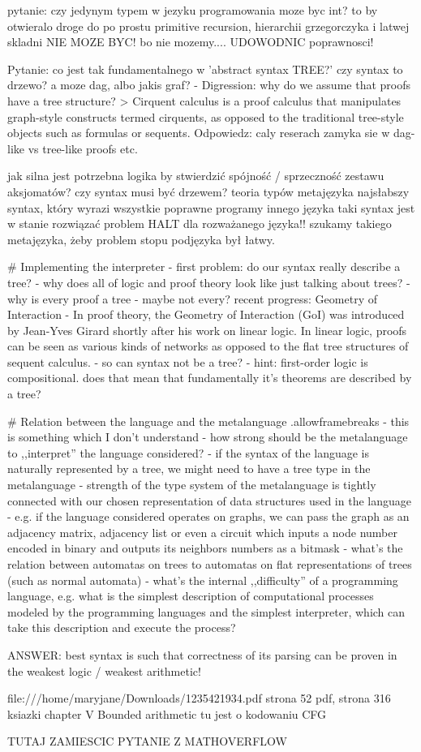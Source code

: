 pytanie: czy jedynym typem w jezyku programowania moze byc int?
to by otwieralo droge do po prostu primitive recursion,
hierarchii grzegorczyka i latwej skladni
NIE MOZE BYC! bo nie mozemy.... UDOWODNIC poprawnosci!


Pytanie: co jest tak fundamentalnego w 'abstract syntax TREE?' czy syntax to drzewo?
a moze dag, albo jakis graf?
- Digression: why do we assume that proofs have a tree structure?
> Cirquent calculus is a proof calculus that manipulates graph-style constructs termed cirquents, as opposed to the traditional tree-style objects such as formulas or sequents.
Odpowiedz: caly reserach zamyka sie w dag-like vs tree-like proofs etc.




jak silna jest potrzebna logika by stwierdzić spójność / sprzeczność zestawu aksjomatów?
czy syntax musi być drzewem?
teoria typów metajęzyka
najsłabszy syntax, który wyrazi wszystkie poprawne programy innego języka
taki syntax jest w stanie rozwiązać problem HALT dla rozważanego języka!!
szukamy takiego metajęzyka, żeby problem stopu podjęzyka był łatwy.





# Implementing the interpreter 
- first problem: do our syntax really describe a tree?
- why does all of logic and proof theory look like just talking about trees?
- why is every proof a tree
- maybe not every? recent progress: Geometry of Interaction
- In proof theory, the Geometry of Interaction (GoI) was introduced by Jean-Yves Girard shortly after his work on linear logic. In linear logic, proofs can be seen as various kinds of networks as opposed to the flat tree structures of sequent calculus.
- so can syntax not be a tree?
- hint: first-order logic is compositional. does that mean that fundamentally
  it's theorems are described by a tree?

# Relation between the language and the metalanguage {.allowframebreaks}
- this is something which I don't understand
- how strong should be the metalanguage to ,,interpret'' the language considered?
- if the syntax of the language is naturally represented by a tree, we might need
  to have a tree type in the metalanguage
- strength of the type system of the metalanguage is tightly connected with
  our chosen representation of data structures used in the language
- e.g. if the language considered operates on graphs, we can pass the graph
  as an adjacency matrix, adjacency list or even a circuit which inputs a 
  node number encoded in binary and outputs its neighbors numbers as a bitmask
- what's the relation between automatas on trees to automatas on flat representations of trees (such as normal automata)
- what's the internal ,,difficulty'' of a programming language, e.g. what is the
  simplest description of computational processes modeled by the programming languages
  and the simplest interpreter, which can take this description and execute the process?

ANSWER: best syntax is such that correctness of its parsing can be proven in 
the weakest logic / weakest arithmetic!


file:///home/maryjane/Downloads/1235421934.pdf
strona 52 pdf, strona 316 ksiazki
chapter V Bounded arithmetic
tu jest o kodowaniu CFG


TUTAJ ZAMIESCIC PYTANIE Z MATHOVERFLOW